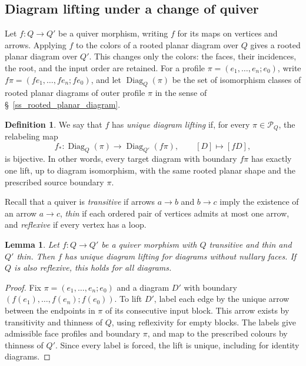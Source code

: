 \documentclass[11pt,letterpaper]{article}
\numberwithin{equation}{section}
\theoremstyle{plain}
\newtheorem{lem}[thm]{Lemma}
\theoremstyle{definition}
\newtheorem{defn}[thm]{Definition}
\theoremstyle{remark}
\begin{document}
\subsection{Diagram lifting under a change of quiver}
\label{ss_change_quiver_trees}
\label{ss_change_quiver_diagrams}
Let $f:Q\to Q'$ be a quiver morphism, writing $f$ for its maps on
vertices and arrows. Applying $f$ to the colors of a rooted planar
diagram over $Q$ gives a rooted planar diagram over $Q'$. This
changes only the colors: the faces, their incidences, the root, and
the input order are retained.
For a profile $\pi=(e_1,\ldots,e_n;e_0)$, write
$f\pi=(fe_1,\ldots,fe_n;fe_0)$, and let
$\operatorname{Diag}_Q(\pi)$ be the set of isomorphism classes of
rooted planar diagrams of outer profile $\pi$ in the sense of
\S~\ref{ss_rooted_planar_diagram}.

\begin{defn}\label{defn_unique_tree_lifting}
\label{defn_unique_diagram_lifting}
We say that $f$ has \textit{unique diagram lifting} if, for every
$\pi\in\mathcal P_Q$, the relabeling map
\begin{equation}\label{eq_unique_diagram_lifting}
 f_*:\operatorname{Diag}_Q(\pi)
 \longrightarrow\operatorname{Diag}_{Q'}(f\pi),
 \qquad [D]\longmapsto[fD],
\end{equation}
is bijective. In other words, every target diagram with boundary $f\pi$ has
exactly one lift, up to diagram isomorphism, with the same rooted
planar shape and the prescribed source boundary $\pi$.
\end{defn}

Recall that a quiver is \textit{transitive} if arrows $a\to b$ and
$b\to c$ imply the existence of an arrow $a\to c$, \textit{thin}
if each ordered pair of vertices admits at most one arrow, and
\textit{reflexive} if every vertex has a loop.

\begin{lem}\label{lem_change_quiver_thin}
Let $f:Q\to Q'$ be a quiver morphism with $Q$ transitive and thin
and $Q'$ thin. Then $f$ has unique diagram lifting for diagrams
without nullary faces. If $Q$ is also reflexive, this holds for all
diagrams.
\end{lem}
\begin{proof}
Fix $\pi=(e_1,\ldots,e_n;e_0)$ and a diagram $D'$ with boundary
$(f(e_1),\ldots,f(e_n);f(e_0))$. To lift $D'$, label each edge by
the unique arrow between the endpoints in $\pi$ of its consecutive
input block. This arrow exists by transitivity and thinness of $Q$,
using reflexivity for empty blocks. The labels give admissible
face profiles and boundary $\pi$, and map to the prescribed colours
by thinness of $Q'$. Since every label is forced, the lift is unique,
including for identity diagrams.
\end{proof}
\end{document}

